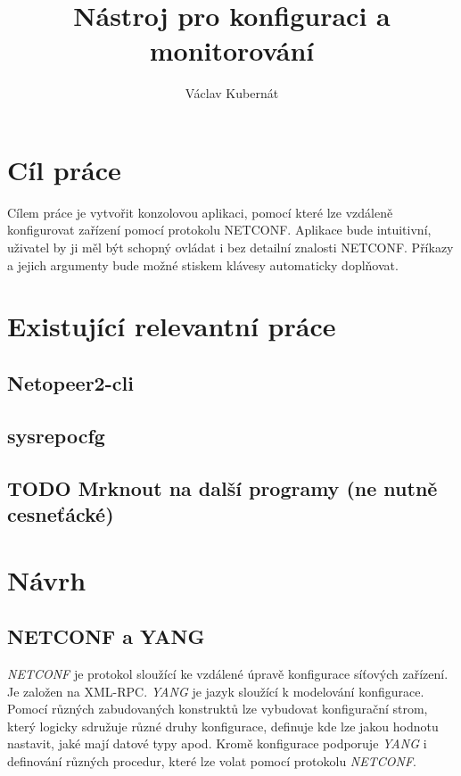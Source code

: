 \documentclass[thesis=B,czech]{FITthesis}[2019/03/06]
\title{Nástroj pro konfiguraci a monitorování}
\author{Václav Kubernát}
\begin{document}
\begin{introduction}



\end{introduction}


\chapter{Cíl práce} 
Cílem práce je vytvořit konzolovou aplikaci, pomocí které lze vzdáleně konfigurovat zařízení pomocí protokolu NETCONF\@. Aplikace bude intuitivní, uživatel by ji měl být schopný ovládat i bez detailní znalosti NETCONF\@. Příkazy a jejich argumenty bude možné stiskem klávesy automaticky doplňovat.


\chapter{Existující relevantní práce}
\section{Netopeer2-cli}
\section{sysrepocfg}
\section{TODO Mrknout na další programy (ne nutně cesneťácké)}


\chapter{Návrh}
\section{NETCONF a YANG}
\textit{NETCONF} je protokol sloužící ke vzdálené úpravě konfigurace síťových zařízení. Je založen na XML-RPC. \textit{YANG} je jazyk sloužící k modelování konfigurace. Pomocí různých zabudovaných konstruktů lze vybudovat konfigurační strom, který logicky sdružuje různé druhy konfigurace, definuje kde lze jakou hodnotu nastavit, jaké mají datové typy apod. Kromě konfigurace podporuje \textit{YANG} i definování různých procedur, které lze volat pomocí protokolu \textit{NETCONF}.
\end{document}
